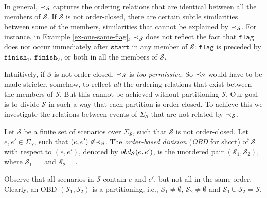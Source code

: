 In general, $\prec_{\mathcal{S}}$ captures the ordering relations that are
identical between all the members of $\mathcal{S}$.
If $\mathcal{S}$ is not order-closed, there are certain subtle
similarities between some of the members, similarities that cannot be
explained by $\prec_{\mathcal{S}}$.
For instance, in
Example \ref{ex-one-same-flag}, $\prec_{\mathcal{S}}$ does not
reflect the fact that $\mathtt{flag}$ does not occur immediately after
$\mathtt{start}$ in any member of $\mathcal{S}$: $\mathtt{flag}$ is
preceded by $\mathtt{finish_1}$, $\mathtt{finish_2}$, or both in all
the members of $\mathcal{S}$.

Intuitively, if $\mathcal{S}$ is not order-closed,
$\prec_{\mathcal{S}}$ is \emph{too permissive}. So
$\prec_{\mathcal{S}}$ would have to be made stricter, somehow, to
reflect \emph{all} the ordering relations that exist between the
members of $\mathcal{S}$. But this cannot be
achieved without partitioning $\mathcal{S}$.
Our goal is to divide $\mathcal{S}$ in such a way that each
partition is order-closed. To achieve this we investigate the
relations between events of $\Sigma_{\mathcal{S}}$ that are not
related by $\prec_{\mathcal{S}}$.
\begin{definition}
\label{def-OBD}
Let $\mathcal{S}$ be a finite set of scenarios over
$\Sigma_{\mathcal{S}}$, such that $\mathcal{S}$ is not order-closed.
Let $e,e'\in\Sigma_{\mathcal{S}}$, such that
$(e,e')\not\in\prec_{\mathcal{S}}$.
The \emph{order-based division} (\emph{OBD} for short)
of $\mathcal{S}$ with respect to $(e,e')$,
denoted by ${obd}_{\mathcal{S}}(e,e')$, is
the unordered pair $(\mathcal{S}_1,\mathcal{S}_2)$, where
$\mathcal{S}_1=$ and
$\mathcal{S}_2=$.
\end{definition}
\noindent
Observe that all scenarios in $\mathcal{S}$ contain $e$ and $e'$, but
not all in the same order.
Clearly, an OBD $(\mathcal{S}_1,\mathcal{S}_2)$ is a partitioning,
i.e., $\mathcal{S}_1\neq\emptyset$, $\mathcal{S}_2\neq\emptyset$ and
$\mathcal{S}_1\cup\mathcal{S}_2=\mathcal{S}$.
